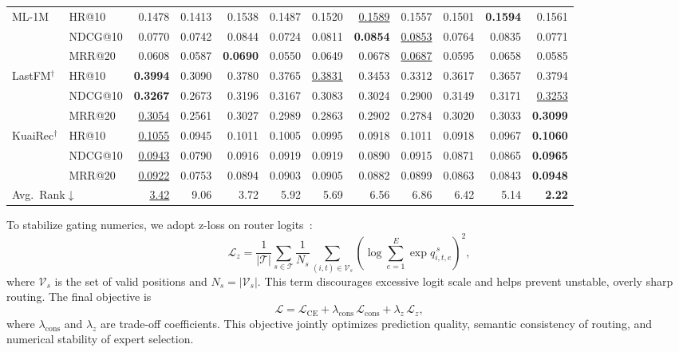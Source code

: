 \documentclass[sigconf,review,anonymous]{acmart}
\newcommand{\tblbest}[1]{\textbf{#1}}
\newcommand{\tblsecond}[1]{\underline{#1}}
\begin{document}
\begin{table}[t]
{\begin{tabular}{llrrrrrrrrrr}
    \midrule
    \multirow{3}{*}{ML-1M}
      & HR@10   & 0.1478 & 0.1413 & 0.1538 & 0.1487 & 0.1520 & \tblsecond{0.1589} & 0.1557 & 0.1501 & \tblbest{0.1594} & 0.1561 \\
      & NDCG@10 & 0.0770 & 0.0742 & 0.0844 & 0.0724 & 0.0811 & \tblbest{0.0854} & \tblsecond{0.0853} & 0.0764 & 0.0835 & 0.0771 \\
      & MRR@20  & 0.0608 & 0.0587 & \tblbest{0.0690} & 0.0550 & 0.0649 & 0.0678 & \tblsecond{0.0687} & 0.0595 & 0.0658 & 0.0585 \\
    \midrule
    \multirow{3}{*}{LastFM$^\dagger$}
      & HR@10   & \tblbest{0.3994} & 0.3090 & 0.3780 & 0.3765 & \tblsecond{0.3831} & 0.3453 & 0.3312 & 0.3617 & 0.3657 & 0.3794 \\
      & NDCG@10 & \tblbest{0.3267} & 0.2673 & 0.3196 & 0.3167 & 0.3083 & 0.3024 & 0.2900 & 0.3149 & 0.3171 & \tblsecond{0.3253} \\
      & MRR@20  & \tblsecond{0.3054} & 0.2561 & 0.3027 & 0.2989 & 0.2863 & 0.2902 & 0.2784 & 0.3020 & 0.3033 & \tblbest{0.3099} \\
    \midrule
    \multirow{3}{*}{KuaiRec$^\dagger$}
      & HR@10   & \tblsecond{0.1055} & 0.0945 & 0.1011 & 0.1005 & 0.0995 & 0.0918 & 0.1011 & 0.0918 & 0.0967 & \tblbest{0.1060} \\
      & NDCG@10 & \tblsecond{0.0943} & 0.0790 & 0.0916 & 0.0919 & 0.0919 & 0.0890 & 0.0915 & 0.0871 & 0.0865 & \tblbest{0.0965} \\
      & MRR@20  & \tblsecond{0.0922} & 0.0753 & 0.0894 & 0.0903 & 0.0905 & 0.0882 & 0.0899 & 0.0863 & 0.0843 & \tblbest{0.0948} \\
    \midrule
    \multicolumn{2}{l}{Avg.~Rank$\downarrow$} & \tblsecond{3.42} & 9.06 & 3.72 & 5.92 & 5.69 & 6.56 & 6.86 & 6.42 & 5.14 & \tblbest{2.22} \\
    \bottomrule
  \end{tabular}}
\end{table}
To stabilize gating numerics, we adopt z-loss on router logits~\cite{zoph2022stmoe}:
\[
\mathcal{L}_{z}
=
\frac{1}{|\mathcal{T}|}
\sum_{s \in \mathcal{T}}
\frac{1}{N_s}
\sum_{(i,t)\in\mathcal{V}_s}
\left(
\log \sum_{e=1}^{E}\exp q_{i,t,e}^{\,s}
\right)^2,
\]
where $\mathcal{V}_s$ is the set of valid positions and $N_s=|\mathcal{V}_s|$. This term discourages excessive logit scale and helps prevent unstable, overly sharp routing. The final objective is
\[
\mathcal{L}
=
\mathcal{L}_{\mathrm{CE}}
+
\lambda_{\mathrm{cons}}\,\mathcal{L}_{\mathrm{cons}}
+
\lambda_{z}\,\mathcal{L}_{z},
\]
where $\lambda_{\mathrm{cons}}$ and $\lambda_z$ are trade-off coefficients. This objective jointly optimizes prediction quality, semantic consistency of routing, and numerical stability of expert selection.
\end{document}
